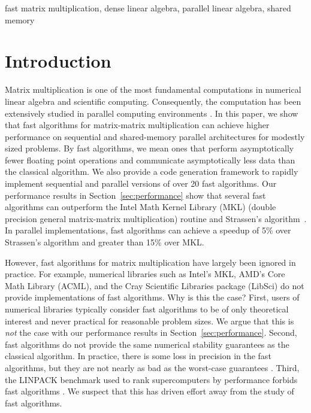 \documentclass[preprint]{sigplanconf}
\begin{document}



\keywords
fast matrix multiplication, dense linear algebra, parallel linear algebra, shared memory

\section{Introduction}

Matrix multiplication is one of the most fundamental computations in numerical linear algebra and scientific computing.
Consequently, the computation has been extensively studied in parallel computing environments \cite{van1997summa, solomonik2011communication, irony2004communication, ballard2012communication, volkov2008benchmarking}.
In this paper, we show that fast algorithms for matrix-matrix multiplication can achieve higher performance on sequential and shared-memory parallel architectures for modestly sized problems.
By fast algorithms, we mean ones that perform asymptotically fewer floating point operations and communicate asymptotically less data than the classical algorithm.
We also provide a code generation framework to rapidly implement sequential and parallel versions of over 20 fast algorithms.
Our performance results in Section~\ref{sec:performance} show that several fast algorithms can outperform the Intel Math Kernel Library (MKL)  (double precision general matrix-matrix multiplication) routine and Strassen's algorithm~\cite{strassen1969gaussian}.
In parallel implementations, fast algorithms can achieve a speedup of 5\% over Strassen's algorithm and greater than 15\% over MKL.

However, fast algorithms for matrix multiplication have largely been ignored in practice.
For example, numerical libraries such as Intel's MKL, AMD's Core Math Library (ACML),
and the Cray Scientific Libraries package (LibSci) do not provide implementations of fast algorithms.
Why is this the case?
First, users of numerical libraries typically consider fast algorithms to be of only theoretical interest and never practical for reasonable problem sizes.
We argue that this is \emph{not} the case with our performance results in Section~\ref{sec:performance}.
Second, fast algorithms do not provide the same numerical stability guarantees as the classical algorithm.
In practice, there is some loss in precision in the fast algorithms, but they are not nearly as bad as the worst-case guarantees \cite{higham2002accuracy,lipshitz2012communication}.
Third, the LINPACK benchmark used to rank supercomputers by performance forbids fast algorithms \cite{TOP500}.
We suspect that this has driven effort away from the study of fast algorithms.
\end{document}
